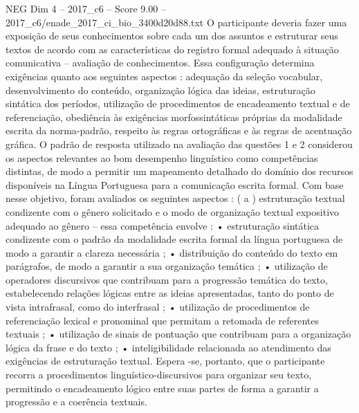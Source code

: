 \begin{textsample}{NEG Dim 4 – 2017\_c6 – Score 9.00 – 2017\_c6/enade\_2017\_ci\_bio\_3400d20d88.txt}
O participante deveria fazer uma exposição de seus conhecimentos sobre cada um dos assuntos e estruturar seus textos de acordo com as características do registro formal adequado à situação comunicativa – avaliação de conhecimentos.
Essa configuração determina exigências quanto aos seguintes aspectos : adequação da seleção vocabular, desenvolvimento do conteúdo, organização lógica das ideias, estruturação sintática dos períodos, utilização de procedimentos de encadeamento textual e de referenciação, obediência às exigências morfossintáticas próprias da modalidade escrita da norma-padrão, respeito às regras ortográficas e às regras de acentuação gráfica.
O padrão de resposta utilizado na avaliação das questões 1 e 2 considerou os aspectos relevantes ao bom desempenho linguístico como competências distintas, de modo a permitir um mapeamento detalhado do domínio dos recursos disponíveis na Língua Portuguesa para a comunicação escrita formal.
Com base nesse objetivo, foram avaliados os seguintes aspectos : ( a ) estruturação textual condizente com o gênero solicitado e o modo de organização textual expositivo adequado ao gênero – essa competência envolve : • estruturação sintática condizente com o padrão da modalidade escrita formal da língua portuguesa de modo a garantir a clareza necessária ; • distribuição do conteúdo do texto em parágrafos, de modo a garantir a sua organização temática ; • utilização de operadores discursivos que contribuam para a progressão temática do texto, estabelecendo relações lógicas entre as ideias apresentadas, tanto do ponto de vista intrafrasal, como do interfrasal ; • utilização de procedimentos de referenciação lexical e pronominal que permitam a retomada de referentes textuais ; • utilização de sinais de pontuação que contribuam para a organização lógica da frase e do texto ; • inteligibilidade relacionada ao atendimento das exigências de estruturação textual.
Espera -se, portanto, que o participante recorra a procedimentos linguístico-discursivos para organizar seu texto, permitindo o encadeamento lógico entre suas partes de forma a garantir a progressão e a coerência textuais.

\end{textsample}
